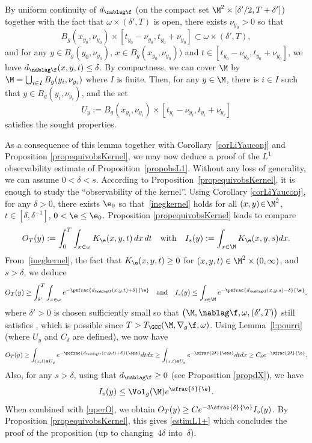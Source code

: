 By uniform continuity of $d_{\nablag\f}$ (on the compact set $\M^2\times [\delta'/2,T+\delta']$) together with the fact that $\omega \times (\delta',T)$ is open, there exists $\nu_{y_0}>0$ so that\enlargethispage{-2\baselineskip}%
\[
B_g(x_{y_0},\nu_{y_0})\times [t_{y_0}-\nu_{y_0}, t_{y_0} +\nu_{y_0}]\subset \omega\times (\delta',T),
\]
and for any $y\in B_g(y_0,\nu_{y_0})$, $x\in B_g(x_{y_0},\nu_{y_0}))$ and $t\in [t_{y_0}-\nu_{y_0}, t_{y_0} +\nu_{y_0}]$, we have $d_{\nablag \f}(x,y,t)\leq \delta$. By compactness, we can cover $\M$ by $\M=\bigcup_{i \in I} B_g(y_i, \nu_{y_i})$ where $I$ is finite. Then, for any $y \in \M$, there is $i\in I$ such that $y \in B_g(y_i, \nu_{y_i})$, and the set
\[
U_y := B_g(x_{y_i},\nu_{y_i})\times [t_{y_i}-\nu_{y_i}, t_{y_i} +\nu_{y_i}]
\]
satisfies the sought properties.
\enp

As a consequence of this lemma together with Corollary~\ref{corLiYauconj} and Proposition \ref{propequivobsKernel}, we may now deduce a proof of the $L^1$ observability estimate of Proposition~\ref{propobsL1}.
Without any loss of generality, we can assume $0<\delta<s$.
According to Proposition~\ref{propequivobsKernel}, it is enough to study the ``observability of the kernel''.
Using Corollary \ref{corLiYauconj}, for any $\delta\!>\!0$, there exists $\e_0$ so that~\eqref{inegkernel}
holds for all $(x,y)\!\in\!\M^2$, $t\in [\delta,\delta^{-1}]$, $0<\e\leq \e_0$.
Proposition \ref{propequivobsKernel} leads to compare
\[
O_{T}(y): =\int_0^T \int_{x\in \omega} K_{\e}(x,y,t)\,dx\,dt
\quad \text{with} \quad
I_{s}(y): =\int_{x\in \M} K_{\e}(x,y,s)dx.
\]
From~\eqref{inegkernel}, the fact that $K_{\e}(x,y,t)\geq0$ for $(x,y,t) \in \M^2 \times (0,\infty)$, and $s >\delta$, we deduce
\[
O_{T}(y) \geq \int_{\delta'}^T \int_{x\in \omega}e^{-\psfrac{d_{\nablag \f}(x,y,t)+\delta}{\e}} \quad \text{and} \quad
I_{s}(y) \leq \int_{x\in \M} e^{-\psfrac{d_{\nablag \f}(x,y,s)-\delta}{\e}},
\]
where $\delta'>0$ is chosen sufficiently small so that $\big(\M, \nablag\f,\omega,(\delta',T)\big)$ still satisfies \pGCC, which is possible since $T>T_{\GCC}(\M, \nabla_g\f,\omega)$.
Using Lemma~\ref{l:pourri} (where $U_y$ and $C_\delta$ are defined), we now have
\begin{equation}
\label{uperO}
O_{T}(y) \geq \int_{(x,t)\in U_y} e^{-\psfrac{d_{\nablag \f}(x,y,t)+\delta}{\eps}} dt dx
\geq \int_{(x,t)\in U_y} e^{-\sfrac{2\delta}{\eps}} dt dx
\geq C_\delta e^{-\sfrac{2\delta }{\e}}.
\end{equation}
Also, for any $s >\delta$, using that $d_{\nablag \f}\geq 0$ (see Proposition \ref{propdX}), we have\enlargethispage{-\baselineskip}%
\[
I_{s}(y)\leq \Vol_g (\M) e^{\sfrac{\delta}{\e}}.
\]
When combined with \eqref{uperO}, we obtain $O_{T}(y) \geq C e^{-3\sfrac{\delta}{\e}} I_{s}(y)$. By Proposition \ref{propequivobsKernel}, this gives \eqref{estimL1+} which concludes the proof of the proposition (up to changing~$4\delta$ into~$\delta$).
\enp

